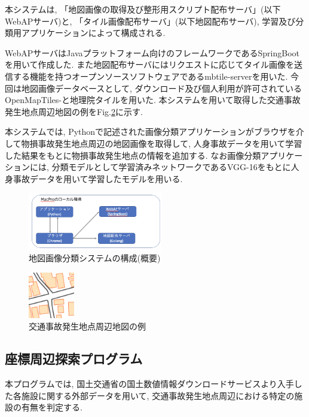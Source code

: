 \documentclass[a4j,8.5pt, twocolumn,fleqn]{jbook}
\begin{document}
本システムは, 「地図画像の取得及び整形用スクリプト配布サーバ」(以下WebAPサーバ)と, 「タイル画像配布サーバ」(以下地図配布サーバ), 学習及び分類用アプリケーションによって構成される. 

WebAPサーバはJavaプラットフォーム向けのフレームワークであるSpringBootを用いて作成した. また地図配布サーバにはリクエストに応じてタイル画像を送信する機能を持つオープンソースソフトウェアであるmbtile-server\cite{mbtile-server}を用いた. 
今回は地図画像データベースとして, ダウンロード及び個人利用が許可されているOpenMapTiles-\cite{openmaptiles}と地理院タイル\cite{tiriixn_tile}を用いた. 
本システムを用いて取得した交通事故発生地点周辺地図の例をFig.\ref{tiriixn}に示す. 

本システムでは, Pythonで記述された画像分類アプリケーションがブラウザを介して物損事故発生地点周辺の地図画像を取得して, 人身事故データを用いて学習した結果をもとに物損事故発生地点の情報を追加する. 
なお画像分類アプリケーションには, 分類モデルとして学習済みネットワークであるVGG-16をもとに人身事故データを用いて学習したモデルを用いる. 

\begin{figure}[htb]
    \centering
    \includegraphics[height=25mm]{images/mapclassification_server.png}
    \vspace{-3mm}
    \caption{地図画像分類システムの構成(概要)}
    \label{classifications}
\end{figure}

\begin{figure}[htb]
    \centering
    \includegraphics[height=20mm]{images/tiriixn.png}
    \vspace{-3mm}
    \caption{交通事故発生地点周辺地図の例}
    \label{tiriixn}
\end{figure}

\subsection{座標周辺探索プログラム}
本プログラムでは, 国土交通省の国土数値情報ダウンロードサービス\cite{国土数値情報ダウンロードサービス}より入手した各施設に関する外部データを用いて, 交通事故発生地点周辺における特定の施設の有無を判定する. 
\end{document}
